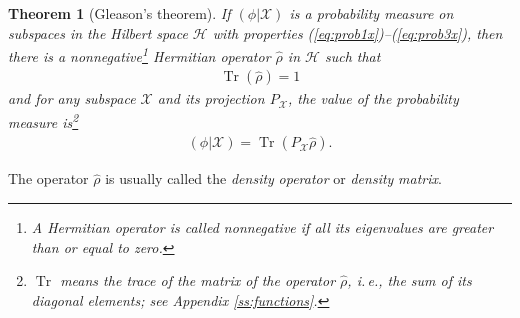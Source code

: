 \documentclass[nochecklpage]{stefan1}
\newtheorem{theorem}{Theorem}[chapter]
\theoremstyle{definition}
\begin{document}
\begin{theorem}[Gleason's theorem]
\label{Theorem.Gleason}
If $ (\phi | \mathscr{X}) $ is a probability measure on subspaces in the
Hilbert space $ \mathscr{H} $ with properties
(\ref{eq:prob1x})--(\ref{eq:prob3x}), then there is a
nonnegative\footnote{A Hermitian operator is called \emph{nonnegative} if
all its eigenvalues are greater than or equal to zero.} Hermitian
operator $ \hat{\rho } $ in $ \mathscr{H} $ such that
%
\begin{align}
\operatorname{Tr} (\hat{\rho }) = 1 \label{eq:(4.28)}
\end{align}
%
and for any subspace $ \mathscr{X} $ and its projection $ P_{
\mathscr{X}} $, the value of the probability measure is\footnote{$ \operatorname{Tr}
$ means the \emph{trace} of the matrix of the operator $ \hat{\rho } $, i.\,e.,
the sum of its diagonal elements; see Appendix \ref{ss:functions}.}
%
\begin{align}
(\phi |\mathscr{X}) = \operatorname{Tr} (P_{\mathscr{X}} \hat{\rho }). \label{eq:(4.29)}
\end{align}
\end{theorem}



The operator $ \hat{\rho } $ is usually called the \emph{density}
\emph{operator} or \emph{density}
\emph{matrix}.
\end{document}
